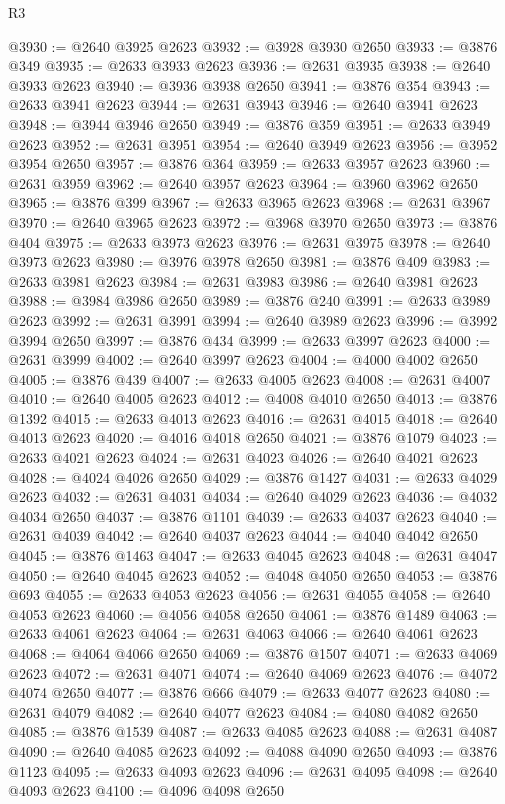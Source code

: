 \begin{lexlean}{R3}
\begin{coremodule}
@3930 := @2640 @3925 @2623
@3932 := @3928 @3930 @2650
@3933 := @3876 @349
@3935 := @2633 @3933 @2623
@3936 := @2631 @3935
@3938 := @2640 @3933 @2623
@3940 := @3936 @3938 @2650
@3941 := @3876 @354
@3943 := @2633 @3941 @2623
@3944 := @2631 @3943
@3946 := @2640 @3941 @2623
@3948 := @3944 @3946 @2650
@3949 := @3876 @359
@3951 := @2633 @3949 @2623
@3952 := @2631 @3951
@3954 := @2640 @3949 @2623
@3956 := @3952 @3954 @2650
@3957 := @3876 @364
@3959 := @2633 @3957 @2623
@3960 := @2631 @3959
@3962 := @2640 @3957 @2623
@3964 := @3960 @3962 @2650
@3965 := @3876 @399
@3967 := @2633 @3965 @2623
@3968 := @2631 @3967
@3970 := @2640 @3965 @2623
@3972 := @3968 @3970 @2650
@3973 := @3876 @404
@3975 := @2633 @3973 @2623
@3976 := @2631 @3975
@3978 := @2640 @3973 @2623
@3980 := @3976 @3978 @2650
@3981 := @3876 @409
@3983 := @2633 @3981 @2623
@3984 := @2631 @3983
@3986 := @2640 @3981 @2623
@3988 := @3984 @3986 @2650
@3989 := @3876 @240
@3991 := @2633 @3989 @2623
@3992 := @2631 @3991
@3994 := @2640 @3989 @2623
@3996 := @3992 @3994 @2650
@3997 := @3876 @434
@3999 := @2633 @3997 @2623
@4000 := @2631 @3999
@4002 := @2640 @3997 @2623
@4004 := @4000 @4002 @2650
@4005 := @3876 @439
@4007 := @2633 @4005 @2623
@4008 := @2631 @4007
@4010 := @2640 @4005 @2623
@4012 := @4008 @4010 @2650
@4013 := @3876 @1392
@4015 := @2633 @4013 @2623
@4016 := @2631 @4015
@4018 := @2640 @4013 @2623
@4020 := @4016 @4018 @2650
@4021 := @3876 @1079
@4023 := @2633 @4021 @2623
@4024 := @2631 @4023
@4026 := @2640 @4021 @2623
@4028 := @4024 @4026 @2650
@4029 := @3876 @1427
@4031 := @2633 @4029 @2623
@4032 := @2631 @4031
@4034 := @2640 @4029 @2623
@4036 := @4032 @4034 @2650
@4037 := @3876 @1101
@4039 := @2633 @4037 @2623
@4040 := @2631 @4039
@4042 := @2640 @4037 @2623
@4044 := @4040 @4042 @2650
@4045 := @3876 @1463
@4047 := @2633 @4045 @2623
@4048 := @2631 @4047
@4050 := @2640 @4045 @2623
@4052 := @4048 @4050 @2650
@4053 := @3876 @693
@4055 := @2633 @4053 @2623
@4056 := @2631 @4055
@4058 := @2640 @4053 @2623
@4060 := @4056 @4058 @2650
@4061 := @3876 @1489
@4063 := @2633 @4061 @2623
@4064 := @2631 @4063
@4066 := @2640 @4061 @2623
@4068 := @4064 @4066 @2650
@4069 := @3876 @1507
@4071 := @2633 @4069 @2623
@4072 := @2631 @4071
@4074 := @2640 @4069 @2623
@4076 := @4072 @4074 @2650
@4077 := @3876 @666
@4079 := @2633 @4077 @2623
@4080 := @2631 @4079
@4082 := @2640 @4077 @2623
@4084 := @4080 @4082 @2650
@4085 := @3876 @1539
@4087 := @2633 @4085 @2623
@4088 := @2631 @4087
@4090 := @2640 @4085 @2623
@4092 := @4088 @4090 @2650
@4093 := @3876 @1123
@4095 := @2633 @4093 @2623
@4096 := @2631 @4095
@4098 := @2640 @4093 @2623
@4100 := @4096 @4098 @2650

\end{coremodule}
\end{lexlean}
